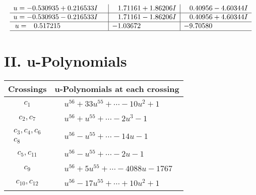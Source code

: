 \documentclass[1p]{elsarticle_modified}
\theoremstyle{definition}
\begin{document}
$$\begin{array}{c|c|c}
\begin{aligned}
u &= -0.530935 + 0.216533 I\end{aligned}
 & \phantom{-}1.71161 + 1.86206 I & \phantom{-}0.40956 - 4.60344 I \\ \hline\begin{aligned}
u &= -0.530935 - 0.216533 I\end{aligned}
 & \phantom{-}1.71161 - 1.86206 I & \phantom{-}0.40956 + 4.60344 I \\ \hline\begin{aligned}
u &= \phantom{-}0.517215\phantom{ +0.000000I}\end{aligned}
 & -1.03672\phantom{ +0.000000I} & -9.70580\phantom{ +0.000000I}\\
 \hline 
 \end{array}$$\newpage
\newpage\renewcommand{\arraystretch}{1}
\centering \section*{ II. u-Polynomials}
\begin{tabular}{m{50pt}|m{274pt}}
Crossings & \hspace{64pt}u-Polynomials at each crossing \\
\hline $$\begin{aligned}c_{1}\end{aligned}$$&$\begin{aligned}
&u^{56}+33 u^{55}+\cdots-10 u^2+1
\end{aligned}$\\
\hline $$\begin{aligned}c_{2},c_{7}\end{aligned}$$&$\begin{aligned}
&u^{56}+u^{55}+\cdots-2 u^3-1
\end{aligned}$\\
\hline $$\begin{aligned}c_{3},c_{4},c_{6}\\c_{8}\end{aligned}$$&$\begin{aligned}
&u^{56}- u^{55}+\cdots-14 u-1
\end{aligned}$\\
\hline $$\begin{aligned}c_{5},c_{11}\end{aligned}$$&$\begin{aligned}
&u^{56}- u^{55}+\cdots-2 u-1
\end{aligned}$\\
\hline $$\begin{aligned}c_{9}\end{aligned}$$&$\begin{aligned}
&u^{56}+5 u^{55}+\cdots-4088 u-1767
\end{aligned}$\\
\hline $$\begin{aligned}c_{10},c_{12}\end{aligned}$$&$\begin{aligned}
&u^{56}-17 u^{55}+\cdots+10 u^2+1
\end{aligned}$\\
\hline
\end{tabular}\newpage\renewcommand{\arraystretch}{1}
\end{document}
